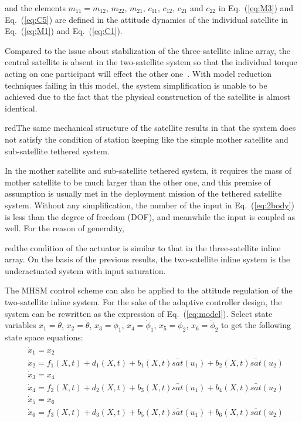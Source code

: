 and the elements $m_{11}=m_{12}$, $m_{22}$, $m_{21}$, $c_{11}$, $c_{12}$, $c_{21}$ and $c_{22}$ in Eq.~(\ref{eq:M3}) and Eq.~(\ref{eq:C5}) are defined in the attitude dynamics of the individual satellite in Eq.~(\ref{eq:M1}) and Eq.~(\ref{eq:C1}).\par
Compared to the issue about stabilization of the three-satellite inline array, the central satellite is absent in the two-satellite system so that the individual torque acting on one participant will effect the other one~\cite{chung2007nonlinear}. With model reduction techniques failing in this model, the system simplification is unable to be achieved due to the fact that the physical construction of the satellite is almost identical. \begin{color}{red}The same mechanical structure of the satellite results in that the system does not satisfy the condition of station keeping like the simple mother satellite and sub-satellite tethered system.\end{color} In the mother satellite and sub-satellite tethered system, it requires the mass of mother satellite to be much larger than the other one, and this premise of assumption is usually met in the deployment mission of the tethered satellite system. Without any simplification, the number of the input in Eq.~(\ref{eq:2body}) is less than the degree of freedom (DOF), and meanwhile the input is coupled as well. For the reason of generality, \begin{color}{red}the condition of the actuator is similar to that in the three-satellite inline array. On the basis of the previous results, the two-satellite inline system is the underactuated system with input saturation.\end{color}\par
The MHSM control scheme can also be applied to the attitude regulation of the two-satellite inline system. For the sake of the adaptive controller design, the system can be rewritten as the expression of Eq.~(\ref{eq:model}). Select state variables $x_1=\theta$, $x_2=\dot\theta$, $x_3=\phi_1$, $x_4=\dot\phi_1$, $x_5=\phi_2$, $x_6=\dot\phi_2$ to get the following state space equations:
\begin{align}
\begin{split}
&\dot x_1 = x_2\\
&\dot x_2 = f_1(X,t)+d_1(X,t)+b_1(X,t)\bar{sat}(u_1)+b_2(X,t)\bar{sat}(u_2)\\
&\dot x_3 = x_4\\
&\dot x_4 = f_2(X,t)+d_2(X,t)+b_3(X,t)\bar{sat}(u_1)+b_4(X,t)\bar{sat}(u_2)\\
&\dot x_5 = x_6\\
&\dot x_6 = f_3(X,t)+d_3(X,t)+b_5(X,t)\bar{sat}(u_1)+b_6(X,t)\bar{sat}(u_2)
\end{split}\label{eq:2model}
\end{align}
